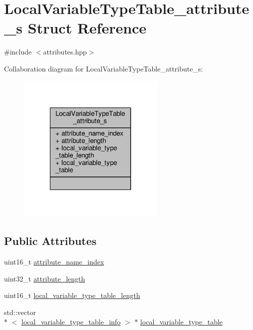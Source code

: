 \hypertarget{structLocalVariableTypeTable__attribute__s}{\section{Local\+Variable\+Type\+Table\+\_\+attribute\+\_\+s Struct Reference}
\label{structLocalVariableTypeTable__attribute__s}
}


{\ttfamily \#include $<$attributes.\+hpp$>$}



Collaboration diagram for Local\+Variable\+Type\+Table\+\_\+attribute\+\_\+s\+:\nopagebreak
\begin{figure}[H]
\begin{center}
\leavevmode
\includegraphics[width=200pt]{structLocalVariableTypeTable__attribute__s__coll__graph}
\end{center}
\end{figure}
\subsection*{Public Attributes}
\begin{DoxyCompactItemize}
\item 
uint16\+\_\+t \hyperlink{structLocalVariableTypeTable__attribute__s_a77c7af17b28fdfe081804f6d7b34a49a}{attribute\+\_\+name\+\_\+index}
\item 
uint32\+\_\+t \hyperlink{structLocalVariableTypeTable__attribute__s_abb4f2b3c349eb2362b044263de18d06e}{attribute\+\_\+length}
\item 
uint16\+\_\+t \hyperlink{structLocalVariableTypeTable__attribute__s_a5f9d25f73fd3f886bc1052974cce379d}{local\+\_\+variable\+\_\+type\+\_\+table\+\_\+length}
\item 
std\+::vector\\*
$<$ \hyperlink{classlocal__variable__type__table__info}{local\+\_\+variable\+\_\+type\+\_\+table\+\_\+info} $>$ $\ast$ \hyperlink{structLocalVariableTypeTable__attribute__s_ad8191d4a435b3c868512e32fce9b613a}{local\+\_\+variable\+\_\+type\+\_\+table}
\end{DoxyCompactItemize}


